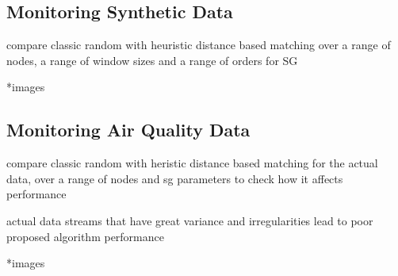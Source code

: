 \subsection{Monitoring Synthetic Data} \label{subsec:mainComp}

compare classic random with heuristic distance based matching over a range of nodes, a range of window sizes and a range of orders for SG

*images

\subsection{Monitoring Air Quality Data} \label{subsec:actualComp}

compare classic random with heristic distance based matching for the actual data, over a range of nodes and sg parameters to check how it affects performance

actual data streams that have great variance and irregularities lead to poor proposed algorithm performance

*images
